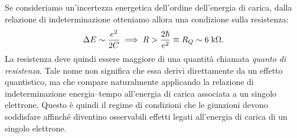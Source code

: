 Se consideriamo un'incertezza energetica dell'ordine dell'energia di carica, dalla relazione di indeterminazione otteniamo allora una condizione sulla resistenza:
\begin{equation*}
    \Delta E
    \sim
    \frac{e^2}{2C}
    \implies
    R
    >
    \frac{2\hbar}{e^2}
    \equiv
    R_Q
    \sim
    6\;\rm k\Omega.
\end{equation*}
La resistenza deve quindi essere maggiore di una quantità chiamata \emph{quanto di resistenza}. Tale nome non significa che essa derivi direttamente da un effetto quantistico, ma che compare naturalmente applicando la relazione di indeterminazione energia--tempo all'energia di carica associata a un singolo elettrone. Questo è quindi il regime di condizioni che le giunzioni devono soddisfare affinché diventino osservabili effetti legati all'energia di carica di un singolo elettrone.
